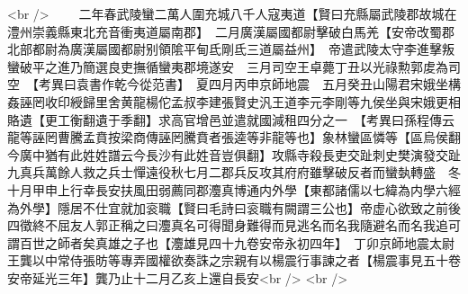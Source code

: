 <br />
　　二年春武陵蠻二萬人圍充城八千人寇夷道【賢曰充縣屬武陵郡故城在澧州崇義縣東北充音衝夷道屬南郡】　二月廣漢屬國都尉擊破白馬羌【安帝改蜀郡北部都尉為廣漢屬國都尉别領隂平甸氐剛氐三道屬益州】　帝遣武陵太守李進擊叛蠻破平之進乃簡選良吏撫循蠻夷郡境遂安　三月司空王卓薨丁丑以光祿勲郭䖍為司空　【考異曰袁書作乾今從范書】　夏四月丙申京師地震　五月癸丑山陽君宋娥坐構姦誣罔收印綬歸里舍黄龍楊佗孟叔李建張賢史汎王道李元李剛等九侯坐與宋娥更相賂遺【更工衡翻遺于季翻】求高官增邑並遣就國減租四分之一　【考異曰孫程傳云龍等誣罔曹騰孟賁按梁商傳誣罔騰賁者張逵等非龍等也】象林蠻區憐等【區烏侯翻今廣中猶有此姓姓譜云今長沙有此姓音豈俱翻】攻縣寺殺長吏交趾刺史樊演發交趾九真兵萬餘人救之兵士憚遠役秋七月二郡兵反攻其府府雖擊破反者而蠻埶轉盛　冬十月甲申上行幸長安扶風田弱薦同郡灋真博通内外學【東都諸儒以七緯為内學六經為外學】隱居不仕宜就加衮職【賢曰毛詩曰衮職有闕謂三公也】帝虚心欲致之前後四徵終不屈友人郭正稱之曰灋真名可得聞身難得而見逃名而名我隨避名而名我追可謂百世之師者矣真雄之子也【灋雄見四十九卷安帝永初四年】　丁卯京師地震太尉王龔以中常侍張昉等專弄國權欲奏誅之宗親有以楊震行事諫之者【楊震事見五十卷安帝延光三年】龔乃止十二月乙亥上還自長安<br />
<br />
